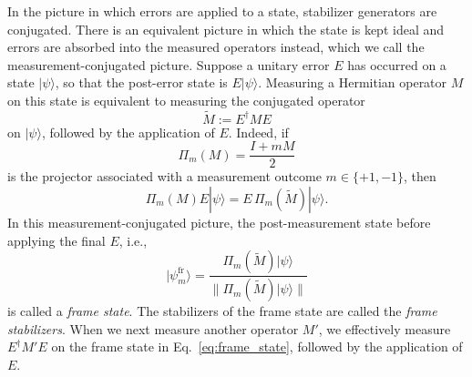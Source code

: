 \documentclass[
 reprint,
 amsmath,amssymb,
 pra,superscriptaddress, nofootinbib
]{revtex4-2}
\theoremstyle{definition}
\theoremstyle{plain}
\begin{document}
In the picture in which errors are applied to a state, stabilizer generators are conjugated.
There is an equivalent picture in which the state is kept ideal and errors are absorbed into the measured operators instead, which we call the measurement-conjugated picture.
Suppose a unitary error $E$ has occurred on a state $|\psi\rangle$, so that the post-error state is $E|\psi\rangle$.
Measuring a Hermitian operator $M$ on this state is equivalent to measuring the conjugated operator
\begin{equation}
  \tilde M := E^\dagger M E
  \label{eq:measurement-frame-operator}
\end{equation}
on $|\psi\rangle$, followed by the application of $E$. Indeed, if
\begin{equation}
  \Pi_m(M)=\frac{I+mM}{2}
  \label{eq:projector}
\end{equation}
is the projector associated with a measurement outcome $m \in \{+1,-1\}$, then
\begin{equation}
  \Pi_m(M)E|\psi\rangle
  =
  E\,\Pi_m (\tilde M )|\psi\rangle.
\end{equation}
In this measurement-conjugated picture, the post-measurement state before applying the final $E$, i.e., 
\begin{equation}
  |\psi^\mathrm{fr}_m \rangle=\frac{\Pi_m (\tilde M )|\psi\rangle}{\|\Pi_m (\tilde M )|\psi\rangle \|}
  \label{eq:frame_state}
\end{equation}
is called a \emph{frame state}.
The stabilizers of the frame state are called the \emph{frame stabilizers}.
When we next measure another operator $M'$, we effectively measure $E^\dagger M'E$ on the frame state in Eq.~\eqref{eq:frame_state}, followed by the application of $E$.
\end{document}

